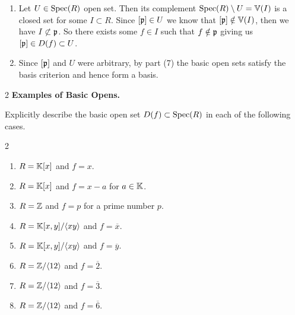 \documentclass[Notebook.tex]{subfiles}
\begin{document}
\begin{solution}
\begin{enumerate}
        \item Let $U \in \operatorname{Spec}(R)$ open set. Then its complement $\operatorname{Spec}(R) \setminus U = \mathbb V(I)$ is a closed set for some $I \subset R$. Since $[\operatorname{\mathfrak{p}}] \in U$ we know that $[\operatorname{\mathfrak{p}}] \notin \mathbb V(I)$, then we have $I \not \subset \operatorname{\mathfrak{p}}$. So there exists some $f \in I$ such that $f \notin \operatorname{\mathfrak{p}}$ giving us $[\operatorname{\mathfrak{p}}] \in D(f) \subset U$.
        
        \item Since $[\operatorname{\mathfrak{p}}]$ and $U$ were arbitrary, by part (7) the basic open sets satisfy the basis criterion and hence form a basis. 
    \end{enumerate}
\end{solution}

\newpage 

\begin{problem}{2}
    \textbf{Examples of Basic Opens.} 
    
    Explicitly describe the basic open set $D(f) \subset \operatorname{Spec}(R)$ in each of the following cases. 
    \begin{multicols}{2}
    \begin{enumerate}
        \item $R=\mathbb K[x]$ and $f=x$.
        \item $R=\mathbb K[x]$ and $f=x-a$ for $a\in \mathbb K$.
        \item $R=\mathbb Z$ and $f=p$ for a prime number $p$.
        \item $R=\mathbb K[x,y]/\langle xy\rangle$ and $f=\overline{x}$.
        \item $R=\mathbb K[x,y]/\langle xy\rangle$ and $f=\overline{y}$.
        \item $R=\mathbb Z/\langle12\rangle$ and $f=\overline{2}$.
        \item $R=\mathbb Z/\langle12\rangle$ and $f=\overline{3}$.
        \item $R=\mathbb Z/\langle12\rangle$ and $f=\overline{6}$.
    \end{enumerate}
    \end{multicols}
\end{problem}
\end{document}

